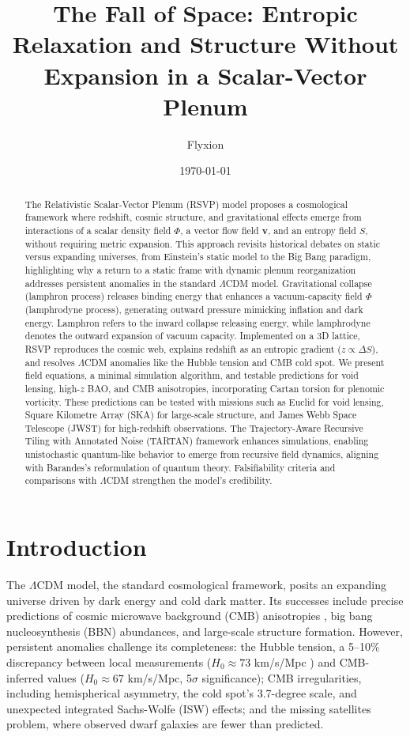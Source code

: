 \documentclass[11pt]{article}
\title{The Fall of Space: Entropic Relaxation and Structure Without Expansion in a Scalar-Vector Plenum}
\author{Flyxion}
\date{\today}
\theoremstyle{plain}
\theoremstyle{definition}
\begin{document}
\maketitle

\begin{abstract}
The Relativistic Scalar-Vector Plenum (RSVP) model proposes a cosmological framework where redshift, cosmic structure, and gravitational effects emerge from interactions of a scalar density field $\Phi$, a vector flow field $\bm{v}$, and an entropy field $S$, without requiring metric expansion. This approach revisits historical debates on static versus expanding universes, from Einstein's static model to the Big Bang paradigm, highlighting why a return to a static frame with dynamic plenum reorganization addresses persistent anomalies in the standard $\Lambda$CDM model. Gravitational collapse (lamphron process) releases binding energy that enhances a vacuum-capacity field $\Phi$ (lamphrodyne process), generating outward pressure mimicking inflation and dark energy. Lamphron refers to the inward collapse releasing energy, while lamphrodyne denotes the outward expansion of vacuum capacity. Implemented on a 3D lattice, RSVP reproduces the cosmic web, explains redshift as an entropic gradient ($z \propto \Delta S$), and resolves $\Lambda$CDM anomalies like the Hubble tension and CMB cold spot. We present field equations, a minimal simulation algorithm, and testable predictions for void lensing, high-$z$ BAO, and CMB anisotropies, incorporating Cartan torsion for plenomic vorticity. These predictions can be tested with missions such as Euclid for void lensing, Square Kilometre Array (SKA) for large-scale structure, and James Webb Space Telescope (JWST) for high-redshift observations. The Trajectory-Aware Recursive Tiling with Annotated Noise (TARTAN) framework enhances simulations, enabling unistochastic quantum-like behavior to emerge from recursive field dynamics, aligning with Barandes’s reformulation of quantum theory. Falsifiability criteria and comparisons with $\Lambda$CDM strengthen the model’s credibility.
\end{abstract}

\section{Introduction}
\label{sec:introduction}
The $\Lambda$CDM model, the standard cosmological framework, posits an expanding universe driven by dark energy and cold dark matter. Its successes include precise predictions of cosmic microwave background (CMB) anisotropies \citep{Planck2018}, big bang nucleosynthesis (BBN) abundances, and large-scale structure formation. However, persistent anomalies challenge its completeness: the Hubble tension, a 5--10\% discrepancy between local measurements ($H_0 \approx 73$ km/s/Mpc \citep{Riess2022}) and CMB-inferred values ($H_0 \approx 67$ km/s/Mpc, 5$\sigma$ significance); CMB irregularities, including hemispherical asymmetry, the cold spot’s 3.7-degree scale, and unexpected integrated Sachs-Wolfe (ISW) effects; and the missing satellites problem, where observed dwarf galaxies are fewer than predicted.
\end{document}
